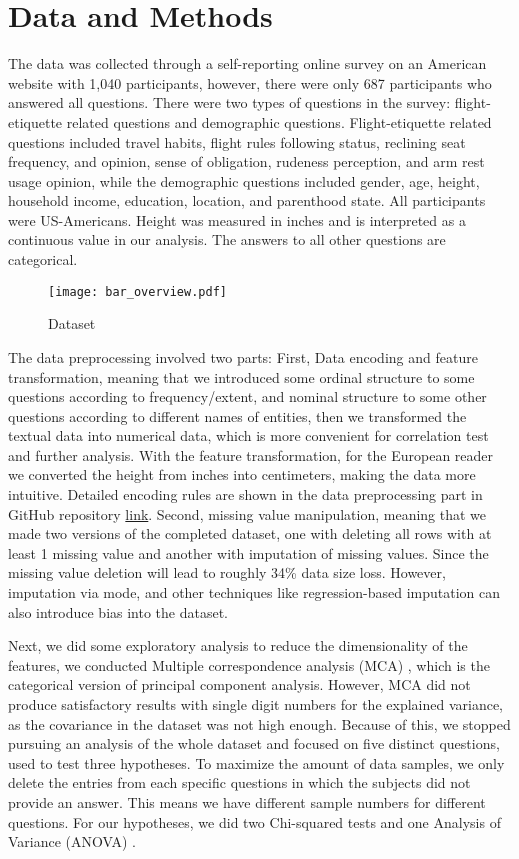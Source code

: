 \documentclass{article}
\theoremstyle{plain}
\theoremstyle{definition}
\theoremstyle{remark}
\begin{document}
\section{Data and Methods}\label{sec:methods}

The data was collected through a self-reporting online survey on an American website with 1,040 participants, however, there were only 687 participants who answered all questions. There were two types of questions in the survey: flight-etiquette related questions and demographic questions. Flight-etiquette related questions included travel habits, flight rules following status, reclining seat frequency, and opinion, sense of obligation, rudeness perception, and arm rest usage opinion, while the demographic questions included gender, age, height, household income, education, location, and parenthood state. All participants were US-Americans. Height was measured in inches and is interpreted as a continuous value in our analysis. The answers to all other questions are categorical. 

\begin{figure*}[]
    \texttt{[image: bar\_overview.pdf]}
    \caption{Dataset}
    \label{bar_overview}
\end{figure*}

The data preprocessing involved two parts: First, Data encoding and feature transformation, meaning that we introduced some ordinal structure to some questions according to frequency/extent, and nominal structure to some other questions according to different names of entities, then we transformed the textual data into numerical data, which is more convenient for correlation test and further analysis. With the feature transformation, for the European reader we converted the height from inches into centimeters, making the data more intuitive. Detailed encoding rules are shown in the data preprocessing part in GitHub repository \href{https://github.com/mloenker/flying-etiquette-data-lit}{link}. Second, missing value manipulation, meaning that we made two versions of the completed dataset, one with deleting all rows with at least 1 missing value and another with imputation of missing values. Since the missing value deletion will lead to roughly 34\% data size loss. However, imputation via mode, and other techniques like regression-based imputation can also introduce bias into the dataset.

Next, we did some exploratory analysis to reduce the dimensionality of the features, we conducted Multiple correspondence analysis (MCA) \citep{abdi2007multiple}, which is the categorical version of principal component analysis. However, MCA did not produce satisfactory results with single digit numbers for the explained variance, as the covariance in the dataset was not high enough. Because of this, we stopped pursuing an analysis of the whole dataset and focused on five distinct questions, used to test three hypotheses. To maximize the amount of data samples, we only delete the entries from each specific questions in which the subjects did not provide an answer. This means we have different sample numbers for different questions. For our hypotheses, we did two Chi-squared tests \citep{Pearson1900} and one Analysis of Variance (ANOVA) \citep{anova}.
\end{document}
